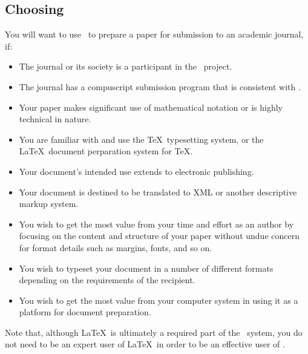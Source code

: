 \documentclass[%
prl%
,twocolumngrid%
,secnumarabic%
,amssymb]{revtex4}
\begin{document}
\subsection{Choosing \revtex}
You will want to use \revtex\ to prepare
a paper for submission to an academic journal,
if:
\begin{itemize}
\item
The journal or its society is a participant in the \revtex\ project.

\item
The journal has a compuscript submission program that is consistent with \revtex.

\item
Your paper makes significant use of mathematical notation or is highly technical in nature.

\item
You are familiar with and use the \TeX\ typesetting system,
or the \LaTeX\ document perparation system for \TeX.

\item
Your document's intended use extends to electronic publishing.

\item
Your document is destined to be translated to XML or another descriptive markup system.

\item
You wish to get the most value from your time and effort as an author
by focusing on the content and structure of your paper
without undue concern for
format details such as margins, fonts, and so on.

\item
You wish to typeset your document in a number of different formats depending on the requirements of the recipient.

\item
You wish to get the most value from your computer system in using it as a platform for document preparation.

\end{itemize}

Note that, although \LaTeX\ is ultimately a required part of the \revtex\ system, 
you do not need to be an expert user of \LaTeX\ in order to be an effective user of \revtex.
\end{document}
